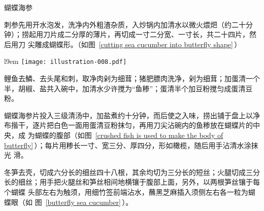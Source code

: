 \begin{recipe}{蝴蝶海参}

\ingredients


\preparation

\step 刺参先用开水泡发，洗净内外粗渣杂质，入炒锅内加清水以微火煨𤆵（约二十分
钟）；捞起用刀片成二分厚的薄片，再切成一寸二分宽、一寸长，共二十四片，然后用刀
尖雕成蝴蝶形。（如图~\ref{cutting sea cucumber into butterfly shape}\,）

\begin{wrapfigure}[7]{l}{9em}%
\centering%
\vspace{-.6875\baselineskip}%
\texttt{[image: illustration-008.pdf]}%
\vspace{-.1875\baselineskip}%
\caption{用海参雕成的蝴蝶形}%
\label{cutting sea cucumber into butterfly shape}%
\end{wrapfigure}

\step 鲤鱼去鱗、去头尾和刺，取净肉剁为细茸；猪肥膘肉洗净，剁为细茸；加蛋清一个
半，胡椒、盐共入碗中，加清水少许搅为“鱼糁”；蛋清半个加豆粉搅匀成蛋清豆粉。

\step 蝴蝶海参片投入三级清汤中，加盐煮约十分钟，而后使之入味，捞出铺于盘上以净
布揩干，逐片把白色一面用蛋清豆粉抹匀，再用刀尖沾碗内的鱼糁放在蝴蝶片的中央，成
为蝴蝶的腹部（如图~\ref{crushed fish is used to make the body of
butterfly}\,）；每片用糁长一寸、宽三分、厚四分，形如橄榄，随后用手沾清水涂抹光
滑。

\step 冬笋去壳，切成六分长的细丝四十八根，其余均切为三分长的短丝；火腿切成三分
长的细丝；用手把火腿丝和笋丝相间地横镶于腹部上面，另外，以两根笋丝镶于每个蝴蝶
头部左右为触须，用细竹签前端沾水，蘸黑芝麻插入须侧左右各一粒为蝴蝶眼（如
图~\ref{butterfly sea cucumber}\,）。


\end{recipe}
